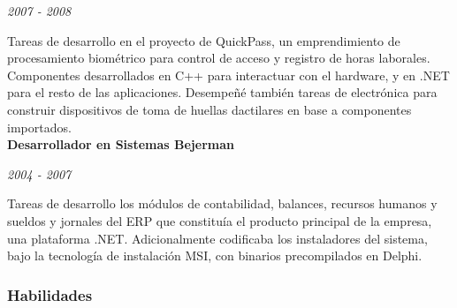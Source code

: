 \documentclass[a4paper,11pt]{article}
\begin{document}
\noindent \emph{2007 - 2008}

\noindent Tareas de desarrollo en el proyecto de QuickPass, un emprendimiento de procesamiento biométrico para control de acceso y registro de horas laborales. Componentes desarrollados en C++ para interactuar con el hardware, y en .NET para el resto de las aplicaciones. Desempeñé también tareas de electrónica para construir dispositivos de toma de huellas dactilares en base a componentes importados. \\

\noindent \textbf{Desarrollador en Sistemas Bejerman}

\noindent \emph{2004 - 2007}

\noindent Tareas de desarrollo los módulos de contabilidad, balances, recursos
humanos y sueldos y jornales del ERP que constituía el producto principal de la
empresa, una plataforma .NET. Adicionalmente codificaba los instaladores del
sistema, bajo la tecnología de instalación MSI, con binarios precompilados en
Delphi. \\

\subsubsection{Habilidades}
\end{document}
